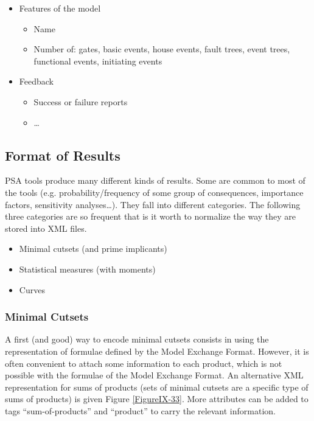 \documentclass[11pt]{article}
\begin{document}
\begin{itemize}
\begin{itemize}
\item \ldots{}
\end{itemize}

\item Features of the model

\begin{itemize}
\item Name

\item Number of: gates, basic events, house events, fault trees, event
trees, functional events, initiating events
\end{itemize}

\item Feedback

\begin{itemize}
\item Success or failure reports

\item \ldots{}
\end{itemize}
\end{itemize}

\subsection{Format of Results}
\label{sec:org31485c7}

PSA tools produce many different kinds of results. Some are common to
most of the tools (e.g. probability/frequency of some group of
consequences, importance factors, sensitivity analyses\ldots{}). They fall
into different categories. The following three categories are so
frequent that is it worth to normalize the way they are stored into XML
files.

\begin{itemize}
\item Minimal cutsets (and prime implicants)

\item Statistical measures (with moments)

\item Curves
\end{itemize}


\subsubsection{Minimal Cutsets}
\label{sec:org54f5059}

A first (and good) way to encode minimal cutsets consists in using the
representation of formulae defined by the Model Exchange Format.
However, it is often convenient to attach some information to each
product, which is not possible with the formulae of the Model Exchange
Format. An alternative XML representation for sums of products (sets of
minimal cutsets are a specific type of sums of products) is given Figure
\ref{FigureIX-33}. More attributes can be added to tags ``sum-of-products'' and
``product'' to carry the relevant information.
\end{document}
